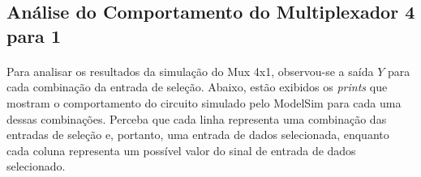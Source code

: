 \documentclass[a4paper,12pt]{article}
\begin{document}
\subsection{Análise do Comportamento do Multiplexador 4 para 1}

\paragraph{}
Para analisar os resultados da simulação do Mux 4x1, observou-se a saída $Y$ para cada combinação da entrada de seleção. Abaixo, estão exibidos os \textit{prints} que mostram o comportamento do circuito simulado pelo ModelSim para cada uma dessas combinações. Perceba que cada linha representa uma combinação das entradas de seleção e, portanto, uma entrada de dados selecionada, enquanto cada coluna representa um possível valor do sinal de entrada de dados selecionado.
\end{document}
